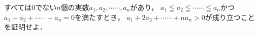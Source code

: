 \documentclass[../../main.tex]{subfiles}
\begin{document}
すべては0でない$n$個の実数$a_1,a_2,\cdots\cdots,a_n$があり，
$a_1 \leqq a_2 \leqq \cdots\cdots \leqq a_n$かつ$a_1+a_2+\cdots\cdots+a_n=0$を満たすとき，
$a_1+2a_2+\cdots\cdots+na_n>0$が成り立つことを証明せよ．
\end{document}
